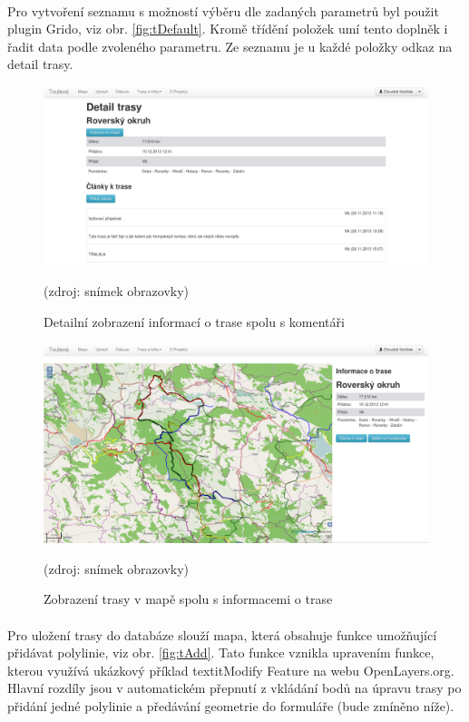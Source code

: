 \documentclass[11pt,a4paper,titlepage,oneside]{book}
\begin{document}
		\paragraph{} Pro vytvoření seznamu s možností výběru dle zadaných parametrů byl použit plugin Grido, viz obr. \ref{fig:tDefault}. Kromě třídění položek umí tento doplněk i řadit data podle zvoleného parametru. Ze seznamu je u každé položky odkaz na detail trasy.
		\begin{figure}[!h]
			\begin{center}
				\includegraphics[width=12cm]{obrazky/toulavej/trackDetail.png}
				\caption{Detailní zobrazení informací o trase spolu s komentáři}
				\label{fig:tDetail}
				(zdroj: snímek obrazovky)
			\end{center}
		\end{figure}
		\begin{figure}[!h]
			\begin{center}
				\includegraphics[width=12cm]{obrazky/toulavej/trackTrack.png}
				\caption{Zobrazení trasy v mapě spolu s informacemi o trase}
				\label{fig:tTrack}
				(zdroj: snímek obrazovky)
			\end{center}
		\end{figure}
			\paragraph{} Pro uložení trasy do databáze slouží mapa, která obsahuje funkce umožňující přidávat polylinie, viz obr. \ref{fig:tAdd}. Tato funkce vznikla upravením funkce, kterou využívá ukázkový příklad textit{Modify Feature} na webu OpenLayers.org\cite{ol}. Hlavní rozdíly jsou v automatickém přepnutí z vkládání bodů na úpravu trasy po přidání jedné polylinie a předávání geometrie do formuláře (bude zmíněno níže).
\end{document}
